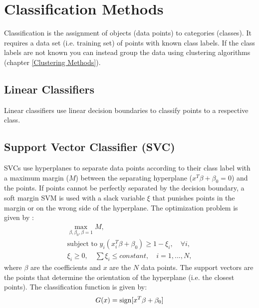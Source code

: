 \documentclass[../main.tex]{subfiles}
\begin{document}
\section{Classification Methods}
Classification is the assignment of objects (data points) to categories (classes). It requires a data set (i.e. training set) of points with known class labels. If the class labels are not known you can instead group the data using clustering algorithms (chapter \ref{Clustering Methods}).


\subsection{Linear Classifiers}
Linear classifiers use linear decision boundaries to classify points to a respective class. 


\subsection{Support Vector Classifier (SVC)}
SVCs use hyperplanes to separate data points according to their class label with a maximum margin ($M$) between the separating hyperplane ($x^T\beta + \beta_0=0$) and the points. If points cannot be perfectly separated by the decision boundary, a soft margin SVM is used with a slack variable $\xi$ that punishes points in the margin or on the wrong side of the hyperplane.
The optimization problem is given by \cite{Hastie2009} : 
\begin{equation}
    \begin{split}
        \max_{\beta, \beta_0, \beta=1} M, \\
        \text{subject to } y_i(x_i^T \beta + \beta_0) \ge 1 - \xi_i, \quad \forall i, \\\xi_i \ge 0, \quad \sum \xi_i \le constant, \quad i= 1, ..., N, 
    \end{split}
\end{equation} 
where $\beta$ are the coefficients and $x$ are the $N$ data points. The support vectors are the points that determine the orientation of the hyperplane (i.e. the closest points).
The classification function is given by: 
\begin{equation}
    G(x) = \operatorname{sign}[x^T\beta + \beta_0] 
\end{equation}




\end{document}
